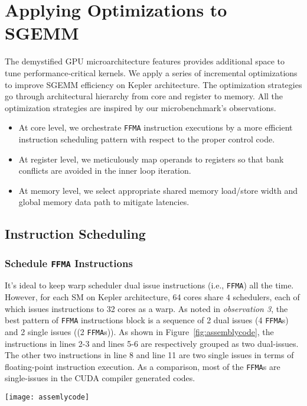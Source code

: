 \section{Applying Optimizations to SGEMM}
\label{sec:optimization}
The demystified GPU microarchitecture features provides additional space to tune performance-critical kernels. We apply a series of incremental optimizations to improve SGEMM efficiency on Kepler architecture. The optimization strategies go through architectural hierarchy from core and register to memory. All the optimization strategies are inspired by our microbenchmark's observations.
\begin{itemize}
\item At core level, we orchestrate {\tt FFMA} instruction executions by a more efficient instruction scheduling pattern with respect to the proper control code.
\item At register level, we meticulously map operands to registers so that  bank conflicts are avoided in the inner loop iteration.
\item At memory level, we select appropriate shared memory load/store width and global memory data path to mitigate latencies.
\end{itemize}

\subsection{Instruction Scheduling}
\subsubsection{Schedule {\tt FFMA} Instructions}
It's ideal to keep warp scheduler dual issue instructions (i.e., {\tt FFMA}) all the time. However, for each SM on Kepler architecture, 64 cores share $4$ schedulers, each of which issues instructions to 32 cores as a warp. As noted in {\em observation 3}, the best pattern of {\tt FFMA} instructions block is a sequence of 2 dual issues (4 {\tt FFMA}s) and 2 single issues ((2 {\tt FFMA}s)). As shown in Figure~\ref{fig:assemblycode}, the instructions in lines 2-3 and lines 5-6 are respectively grouped as two dual-issues. The other two instructions in line 8 and line 11 are two single issues in terms of floating-point instruction execution. As a comparison, most of the {\tt FFMA}s are single-issues in the CUDA compiler generated codes.

\begin{figure*}[htbp]
\begin{center}
\texttt{[image: assemlycode]}
    \caption{The comparison of compiler generated codes and our tuned assembly codes.}
\label{fig:assemblycode}
\end{center}
\end{figure*}

